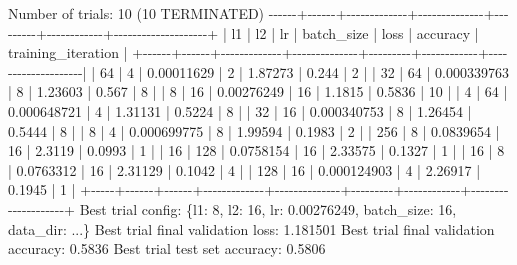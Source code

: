 \documentclass[
  letterpaper,
  DIV=11,
  numbers=noendperiod]{scrreprt}
\newenvironment{Shaded}{\begin{snugshade}}{\end{snugshade}}
\newcommand{\NormalTok}[1]{\textcolor[rgb]{0.00,0.23,0.31}{#1}}
\begin{document}
\begin{Shaded}
\begin{Highlighting}[]
\NormalTok{Number of trials: 10 (10 TERMINATED)}
\NormalTok{{-}{-}{-}{-}{-}{-}+{-}{-}{-}{-}{-}{-}+{-}{-}{-}{-}{-}{-}{-}{-}{-}{-}{-}{-}{-}+{-}{-}{-}{-}{-}{-}{-}{-}{-}{-}{-}{-}{-}{-}+{-}{-}{-}{-}{-}{-}{-}{-}{-}+{-}{-}{-}{-}{-}{-}{-}{-}{-}{-}{-}{-}+{-}{-}{-}{-}{-}{-}{-}{-}{-}{-}{-}{-}{-}{-}{-}{-}{-}{-}{-}{-}+}
\NormalTok{|   l1 |   l2 |          lr |   batch\_size |    loss |   accuracy | training\_iteration |}
\NormalTok{+{-}{-}{-}{-}{-}{-}+{-}{-}{-}{-}{-}{-}+{-}{-}{-}{-}{-}{-}{-}{-}{-}{-}{-}{-}{-}+{-}{-}{-}{-}{-}{-}{-}{-}{-}{-}{-}{-}{-}{-}+{-}{-}{-}{-}{-}{-}{-}{-}{-}+{-}{-}{-}{-}{-}{-}{-}{-}{-}{-}{-}{-}+{-}{-}{-}{-}{-}{-}{-}{-}{-}{-}{-}{-}{-}{-}{-}{-}{-}{-}{-}{-}|}
\NormalTok{|   64 |    4 | 0.00011629  |            2 | 1.87273 |     0.244  |                  2 |}
\NormalTok{|   32 |   64 | 0.000339763 |            8 | 1.23603 |     0.567  |                  8 |}
\NormalTok{|    8 |   16 | 0.00276249  |           16 | 1.1815  |     0.5836 |                 10 |}
\NormalTok{|    4 |   64 | 0.000648721 |            4 | 1.31131 |     0.5224 |                  8 |}
\NormalTok{|   32 |   16 | 0.000340753 |            8 | 1.26454 |     0.5444 |                  8 |}
\NormalTok{|    8 |    4 | 0.000699775 |            8 | 1.99594 |     0.1983 |                  2 |}
\NormalTok{|  256 |    8 | 0.0839654   |           16 | 2.3119  |     0.0993 |                  1 |}
\NormalTok{|   16 |  128 | 0.0758154   |           16 | 2.33575 |     0.1327 |                  1 |}
\NormalTok{|   16 |    8 | 0.0763312   |           16 | 2.31129 |     0.1042 |                  4 |}
\NormalTok{|  128 |   16 | 0.000124903 |            4 | 2.26917 |     0.1945 |                  1 |}
\NormalTok{+{-}{-}{-}{-}{-}+{-}{-}{-}{-}{-}{-}+{-}{-}{-}{-}{-}{-}+{-}{-}{-}{-}{-}{-}{-}{-}{-}{-}{-}{-}{-}+{-}{-}{-}{-}{-}{-}{-}{-}{-}{-}{-}{-}{-}{-}+{-}{-}{-}{-}{-}{-}{-}{-}{-}+{-}{-}{-}{-}{-}{-}{-}{-}{-}{-}{-}{-}+{-}{-}{-}{-}{-}{-}{-}{-}{-}{-}{-}{-}{-}{-}{-}{-}{-}{-}{-}{-}+}
\NormalTok{Best trial config: \{\textquotesingle{}l1\textquotesingle{}: 8, \textquotesingle{}l2\textquotesingle{}: 16, \textquotesingle{}lr\textquotesingle{}: 0.00276249, \textquotesingle{}batch\_size\textquotesingle{}: 16, \textquotesingle{}data\_dir\textquotesingle{}: \textquotesingle{}...\textquotesingle{}\}}
\NormalTok{Best trial final validation loss: 1.181501}
\NormalTok{Best trial final validation accuracy: 0.5836}
\NormalTok{Best trial test set accuracy: 0.5806}
\end{Highlighting}
\end{Shaded}
\end{document}
